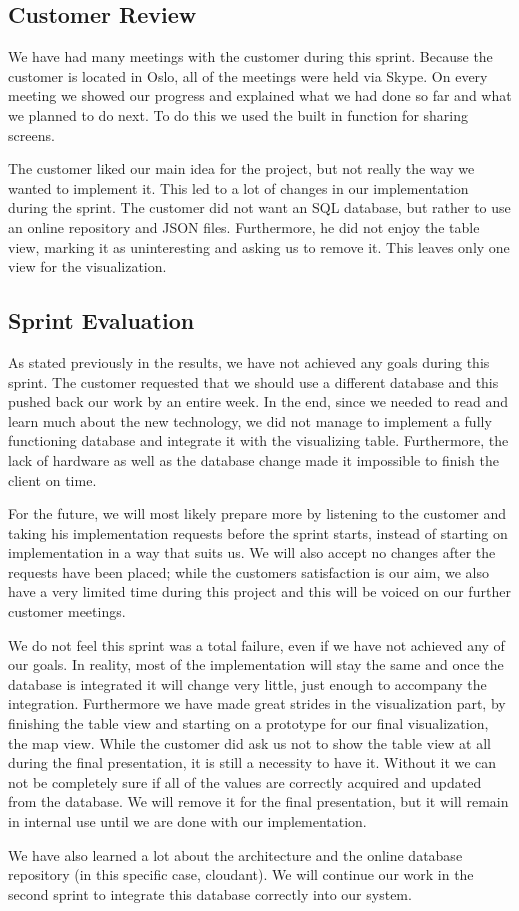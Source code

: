 \documentclass[../document.tex]{subfiles}
\begin{document}
\subsection{Customer Review}
We have had many meetings with the customer during this sprint. Because the customer is located in Oslo, all of the meetings were held via Skype. On every meeting we showed our progress and explained what we had done so far and what we planned to do next. To do this we used the built in function for sharing screens. 

The customer liked our main idea for the project, but not really the way we wanted to implement it. This led to a lot of changes in our implementation during the sprint. The customer did not want an SQL database, but rather to use an online repository and JSON files. Furthermore, he did not enjoy the table view, marking it as uninteresting and asking us to remove it. This leaves only one view for the visualization. 

\subsection{Sprint Evaluation}
As stated previously in the results, we have not achieved any goals during this sprint. The customer requested that we should use a different database and this pushed back our work by an entire week. In the end, since we needed to read and learn much about the new technology, we did not manage to implement a fully functioning database and integrate it with the visualizing table. Furthermore, the lack of hardware as well as the database change made it impossible to finish the client on time.

For the future, we will most likely prepare more by listening to the customer and taking his implementation requests before the sprint starts, instead of starting on implementation in a way that suits us. We will also accept no changes after the requests have been placed; while the customers satisfaction is our aim, we also have a very limited time during this project and this will be voiced on our further customer meetings.

We do not feel this sprint was a total failure, even if we have not achieved any of our goals. In reality, most of the implementation will stay the same and once the database is integrated it will change very little, just enough to accompany the integration. Furthermore we have made great strides in the visualization part, by finishing the table view and starting on a prototype for our final visualization, the map view. While the customer did ask us not to show the table view at all during the final presentation, it is still a necessity to have it. Without it we can not be completely sure if all of the values are correctly acquired and updated from the database. We will remove it for the final presentation, but it will remain in internal use until we are done with our implementation.

We have also learned a lot about the architecture and the online database repository (in this specific case, cloudant). We will continue our work in the second sprint to integrate this database correctly into our system.
\end{document}
